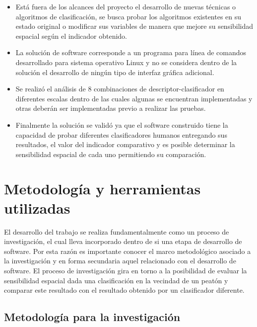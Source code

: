 \begin{itemize}

\item Está fuera de los alcances del proyecto el desarrollo de nuevas técnicas o algoritmos de clasificación, se busca probar los algoritmos existentes en su estado original o modificar sus variables de manera que mejore su sensibilidad espacial según el indicador obtenido.

\item La solución de software corresponde a un programa para línea de comandos desarrollado para sistema operativo Linux y no se considera dentro de la solución el desarrollo de ningún tipo de interfaz gráfica adicional.

\item Se realizó el análisis de 8 combinaciones de descriptor-clasificador en diferentes escalas dentro de las cuales algunas se encuentran implementadas y otras deberán ser implementadas previo a realizar las pruebas.

\item Finalmente la solución se validó ya que el software construido tiene la capacidad de probar diferentes clasificadores humanos entregando sus resultados, el valor del indicador comparativo y es posible determinar la sensibilidad espacial de cada uno permitiendo su comparación.

\end{itemize}


\section{Metodolog\'ia y herramientas utilizadas}
\label{intro:metodologia}

El desarrollo del trabajo se realiza fundamentalmente como un proceso de investigación, el cual lleva incorporado dentro de si una etapa de desarrollo de software. Por esta razón es importante conocer el marco metodológico asociado a la investigación y en forma secundaria aquel relacionado con el desarrollo de software.
El proceso de investigación gira en torno a la posibilidad de evaluar la sensibilidad espacial dada una clasificación en la vecindad de un peatón y comparar este resultado con el resultado obtenido por un clasificador diferente.

\subsection{Metodología para la investigación}

